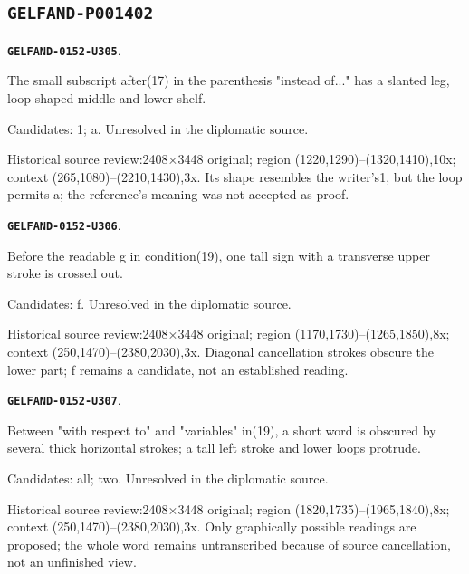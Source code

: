 \documentclass[11pt]{article}
\theoremstyle{definition}
\theoremstyle{remark}
\begin{document}
\subsection*{\texttt{GELFAND-P001402}}
\par\noindent\leavevmode{}\label{GELFAND-0152-U305}\label{GELFAND-P001402:remark-18-subscript:note}\textbf{\texttt{GELFAND-0152-U305}}.\nopagebreak[4]\par
The small subscript after(17) in the parenthesis "instead of..." has a slanted leg, loop-shaped middle and lower shelf.\par
Candidates: 1; a. Unresolved in the diplomatic source.\par
Historical source review:2408×3448 original; region (1220,1290)–(1320,1410),10x; context (265,1080)–(2210,1430),3x. Its shape resembles the writer's1, but the loop permits a; the reference's meaning was not accepted as proof.\par\medskip
\par\noindent\leavevmode{}\label{GELFAND-0152-U306}\label{GELFAND-P001402:cancelled-19-symbol:note}\textbf{\texttt{GELFAND-0152-U306}}.\nopagebreak[4]\par
Before the readable g in condition(19), one tall sign with a transverse upper stroke is crossed out.\par
Candidates: f. Unresolved in the diplomatic source.\par
Historical source review:2408×3448 original; region (1170,1730)–(1265,1850),8x; context (250,1470)–(2380,2030),3x. Diagonal cancellation strokes obscure the lower part; f remains a candidate, not an established reading.\par\medskip
\par\noindent\leavevmode{}\label{GELFAND-0152-U307}\label{GELFAND-P001402:cancelled-19-word:note}\textbf{\texttt{GELFAND-0152-U307}}.\nopagebreak[4]\par
Between "with respect to" and "variables" in(19), a short word is obscured by several thick horizontal strokes; a tall left stroke and lower loops protrude.\par
Candidates: all; two. Unresolved in the diplomatic source.\par
Historical source review:2408×3448 original; region (1820,1735)–(1965,1840),8x; context (250,1470)–(2380,2030),3x. Only graphically possible readings are proposed; the whole word remains untranscribed because of source cancellation, not an unfinished view.\par\medskip
\end{document}

